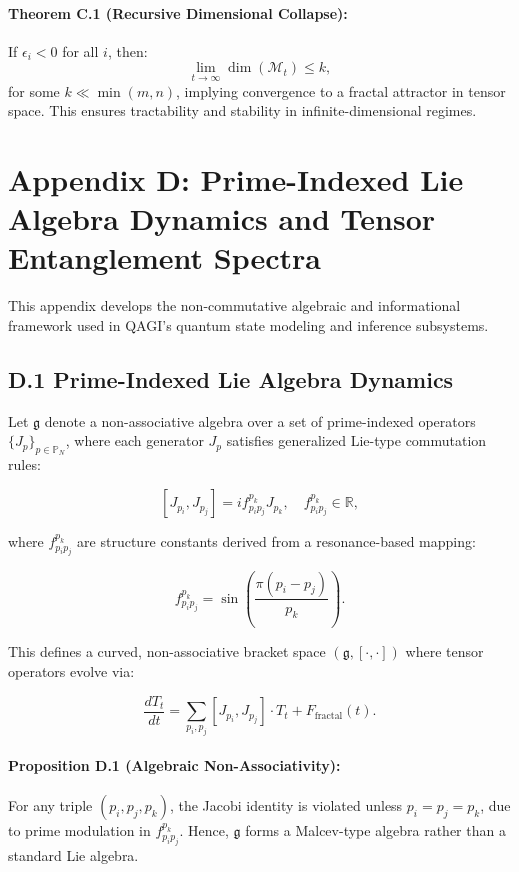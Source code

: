 \paragraph{Theorem C.1 (Recursive Dimensional Collapse):}
If \(\epsilon_i < 0\) for all \(i\), then:
\[
\lim_{t \to \infty} \dim(\mathcal{M}_t) \leq k,
\]
for some \(k \ll \min(m, n)\), implying convergence to a fractal attractor in tensor space. This ensures tractability and stability in infinite-dimensional regimes.


\section*{Appendix D: Prime-Indexed Lie Algebra Dynamics and Tensor Entanglement Spectra}

This appendix develops the non-commutative algebraic and informational framework used in QAGI’s quantum state modeling and inference subsystems.

\subsection*{D.1 Prime-Indexed Lie Algebra Dynamics}

Let \(\mathfrak{g}\) denote a non-associative algebra over a set of prime-indexed operators \(\{J_p\}_{p \in \mathbb{P}_N}\), where each generator \(J_p\) satisfies generalized Lie-type commutation rules:

\[
[J_{p_i}, J_{p_j}] = i f_{p_i p_j}^{p_k} J_{p_k}, \quad f_{p_i p_j}^{p_k} \in \mathbb{R},
\]

where \(f_{p_i p_j}^{p_k}\) are structure constants derived from a resonance-based mapping:

\[
f_{p_i p_j}^{p_k} = \sin\left( \frac{\pi (p_i - p_j)}{p_k} \right).
\]

This defines a curved, non-associative bracket space \((\mathfrak{g}, [\cdot,\cdot])\) where tensor operators evolve via:

\[
\frac{dT_t}{dt} = \sum_{p_i, p_j} [J_{p_i}, J_{p_j}] \cdot T_t + F_{\text{fractal}}(t).
\]

\paragraph{Proposition D.1 (Algebraic Non-Associativity):}
For any triple \((p_i, p_j, p_k)\), the Jacobi identity is violated unless \(p_i = p_j = p_k\), due to prime modulation in \(f_{p_i p_j}^{p_k}\). Hence, \(\mathfrak{g}\) forms a Malcev-type algebra rather than a standard Lie algebra.

